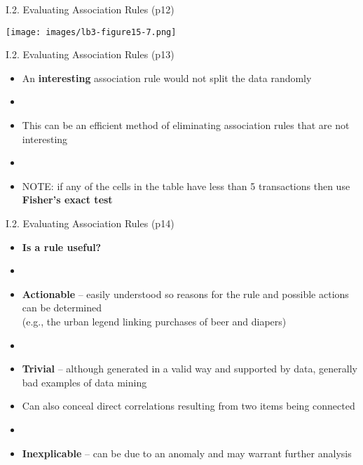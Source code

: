 \documentclass[handout]{beamer}
\newcommand{\strong}[1]{\textbf{\color{teal} #1}}
\begin{document}
\begin{frame}{I.2. Evaluating Association Rules (p12)}
\begin{center}
\texttt{[image: images/lb3-figure15-7.png]}\\
\cite[Figure 15.7]{LB3:2011}
\end{center}
\end{frame}
\begin{frame}{I.2. Evaluating Association Rules (p13)}
\begin{itemize}
\item An \strong{interesting} association rule would not split the data randomly
\item[]
\item This can be an efficient method of eliminating association rules that are not interesting
\item[]
\item NOTE: if any of the cells in the table have less than 5 transactions then use \strong{Fisher's exact test}
\end{itemize}
\end{frame}
\begin{frame}{I.2. Evaluating Association Rules (p14)}
\begin{itemize}
\item[] \strong{Is a rule useful?}
\item[]
\item \strong{Actionable} -- easily understood so reasons for the rule and possible actions can be determined\\
(e.g., the urban legend linking purchases of beer and diapers)
\item[]
\item \strong{Trivial} -- although generated in a valid way and supported by data,  generally bad examples of data mining\\
\item Can also conceal direct correlations resulting from two items being connected
\item[]
\item \strong{Inexplicable} -- can be due to an anomaly and may warrant further analysis
\end{itemize}
\end{frame}
\end{document}
